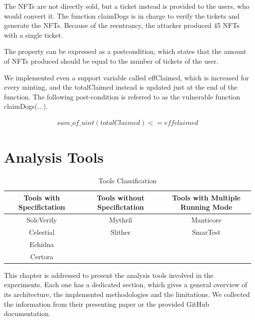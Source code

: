 The NFTs are not directly sold, but a ticket instead is provided to the users, who would convert it. The function claimDogs 
is in charge to verify the tickets and generate the NFTs. Because of the reentrancy, the attacker produced 45 NFTs with a single ticket.

The property can be expressed as a postcondition, which states that the amount of NFTs produced should be equal to the number of tickets of the user. 

We implemented even a support variable called effClaimed, which is increased for every minting, and the totalClaimed instead is updated just at the end of the function. 
The following post-condition is referred to as the vulnerable function claimDogs(...).

\begin{equation}
    \begin{split}
        sum\_of\_uint(totalClaimed) <= effclaimed
    \end{split}
\end{equation}

\chapter{Analysis Tools}
\label{ch:Tools}

\begin{center}
    

\begin{table}
    \caption{Tools Classification}
        \label{tab:ToolsClassification}
        \begin{tabular}{ccc}
        \toprule
            Tools with Specifictation & Tools without Specifictation & Tools with Multiple Running Mode \\
            \midrule
            SolcVerify  & Mythril &  Manticore \\
            Celestial & Slither &  SmarTest \\
            Echidna & & \\
            Certora & & \\ 
        \bottomrule
        \end{tabular}
    \end{table}
\end{center}

This chapter is addressed to present the analysis tools involved in the experiments. 
Each one has a dedicated section, which gives a general overview of its architecture, the implemented methodologies and the limitations. 
We collected the information from their presenting paper or the provided GitHub documentation.


